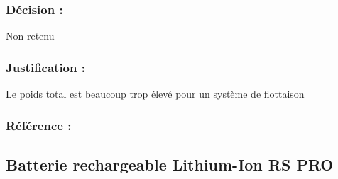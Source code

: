 \subsubsection{Décision :} 
Non retenu
\subsubsection{Justification :} 
Le poids total est beaucoup trop élevé pour un système de flottaison
\subsubsection{Référence : } 

\subsection{Batterie rechargeable Lithium-Ion RS PRO}
